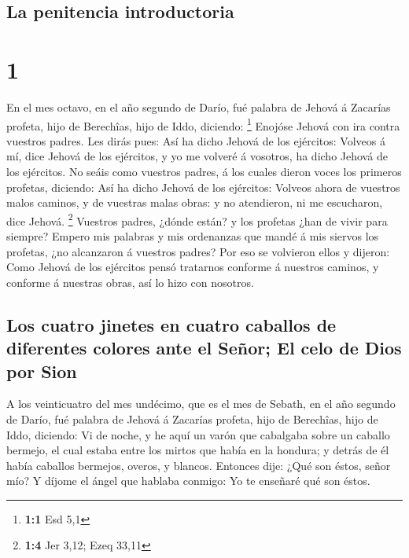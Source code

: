 \hypertarget{la-penitencia-introductoria}{%
\subsection{La penitencia
introductoria}\label{la-penitencia-introductoria}}

\hypertarget{section}{%
\section{1}\label{section}}

 En el mes octavo, en el año segundo de Darío, fué palabra
de Jehová á Zacarías profeta, hijo de Berechîas, hijo de Iddo, diciendo:
\footnote{\textbf{1:1} Esd 5,1}  Enojóse Jehová con ira
contra vuestros padres.  Les dirás pues: Así ha dicho
Jehová de los ejércitos: Volveos á mí, dice Jehová de los ejércitos, y
yo me volveré á vosotros, ha dicho Jehová de los ejércitos.
 No seáis como vuestros padres, á los cuales dieron voces
los primeros profetas, diciendo: Así ha dicho Jehová de los ejércitos:
Volveos ahora de vuestros malos caminos, y de vuestras malas obras: y no
atendieron, ni me escucharon, dice Jehová. \footnote{\textbf{1:4} Jer
  3,12; Ezeq 33,11}  Vuestros padres, ¿dónde están? y los
profetas ¿han de vivir para siempre?  Empero mis palabras
y mis ordenanzas que mandé á mis siervos los profetas, ¿no alcanzaron á
vuestros padres? Por eso se volvieron ellos y dijeron: Como Jehová de
los ejércitos pensó tratarnos conforme á nuestros caminos, y conforme á
nuestras obras, así lo hizo con nosotros.

\hypertarget{los-cuatro-jinetes-en-cuatro-caballos-de-diferentes-colores-ante-el-seuxf1or-el-celo-de-dios-por-sion}{%
\subsection{Los cuatro jinetes en cuatro caballos de diferentes colores
ante el Señor; El celo de Dios por
Sion}\label{los-cuatro-jinetes-en-cuatro-caballos-de-diferentes-colores-ante-el-seuxf1or-el-celo-de-dios-por-sion}}

 A los veinticuatro del mes undécimo, que es el mes de
Sebath, en el año segundo de Darío, fué palabra de Jehová á Zacarías
profeta, hijo de Berechîas, hijo de Iddo, diciendo:  Vi de
noche, y he aquí un varón que cabalgaba sobre un caballo bermejo, el
cual estaba entre los mirtos que había en la hondura; y detrás de él
había caballos bermejos, overos, y blancos.  Entonces
dije: ¿Qué son éstos, señor mío? Y díjome el ángel que hablaba conmigo:
Yo te enseñaré qué son éstos.

